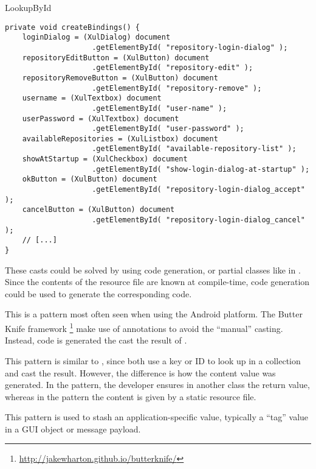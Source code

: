 \begin{pattern}{LookupById}
\begin{verbatim}
private void createBindings() {
    loginDialog = (XulDialog) document
                    .getElementById( "repository-login-dialog" );
    repositoryEditButton = (XulButton) document
                    .getElementById( "repository-edit" );
    repositoryRemoveButton = (XulButton) document
                    .getElementById( "repository-remove" );
    username = (XulTextbox) document
                    .getElementById( "user-name" );
    userPassword = (XulTextbox) document
                    .getElementById( "user-password" );
    availableRepositories = (XulListbox) document
                    .getElementById( "available-repository-list" );
    showAtStartup = (XulCheckbox) document
                    .getElementById( "show-login-dialog-at-startup" );
    okButton = (XulButton) document
                    .getElementById( "repository-login-dialog_accept" );
    cancelButton = (XulButton) document
                    .getElementById( "repository-login-dialog_cancel" );
    // [...]
}
\end{verbatim}

These casts could be solved by using code generation,
or partial classes like in \csharp{}.
Since the contents of the resource file are known at compile-time,
code generation could be used to generate the corresponding \java{} code.

This is a pattern most often seen when using the Android platform.
The Butter Knife framework%
\footnote{\url{http://jakewharton.github.io/butterknife/}}
make use of annotations to avoid the ``manual'' casting.
Instead, code is generated the cast the result of .

This pattern is similar to ,
since both use a key or ID to look up in a collection and cast the result.
However, the difference is how the content value was generated.
In the  pattern,
the developer ensures in another class the return value,
whereas in the \thisp{} pattern the content is given by a static resource file.








This pattern is used to stash an application-specific value,
typically a ``tag'' value in a GUI object or message payload.


\end{pattern}

